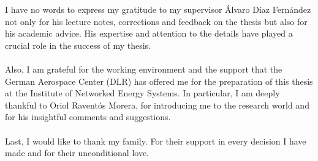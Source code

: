 \documentclass[
11pt, %
english, %
singlespacing, %
headsepline, %
]{MastersDoctoralThesis} %
\begin{document}

\begin{acknowledgements}
\addchaptertocentry{\acknowledgementname} %
I have no words to express my gratitude to my supervisor Álvaro Díaz Fernández not only for his lecture notes, corrections and feedback on the thesis but also for his academic advice. His expertise and attention to the details have played a crucial role in the success of my thesis. \\\\
Also, I am grateful for the working environment and the support that the German Aerospace Center (DLR) has offered me for the preparation of this thesis at the Institute of Networked Energy Systems. In particular, I am deeply thankful to Oriol Raventós Morera, for introducing me to the research world and for his insightful comments and suggestions.\\\\
Last, I would like to thank my family. For their support in every decision I have made and for their unconditional love.
\end{acknowledgements}


\tableofcontents %

\listoffigures %

\listoftables %

\end{document}
